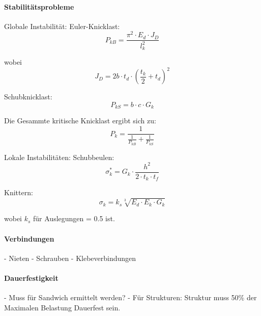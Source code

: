   \paragraph{Stabilitätsprobleme}
  Globale Instabilität:
    Euler-Knicklast:
    \begin{equation}
      \label{Euler-Knicklast}
      P_{kB}=\frac{\pi^2 \cdot E_d \cdot J_D}{l_k^2}
    \end{equation}

    wobei
    \begin{equation}
      \label{JD}
      J_D = 2b \cdot t_d\cdot \left ( \frac{t_k}{2}+t_d \right )^2
    \end{equation}

    Schubknicklast:
    \begin{equation}
      \label{Schubknicklast}
      P_{kS} = b \cdot c \cdot G_k
    \end{equation}

    Die Gesammte kritische Knicklast ergibt sich zu:
    \begin{equation}
      \label{Knicklast}
      P_k=\frac{1}{\frac{1}{P_{kB}}+\frac{1}{P_{kS}}}
    \end{equation}

  Lokale Instabilitäten:
  Schubbeulen:
  \begin{equation}
    \label{Schubbeulen}
    \sigma_k^* = G_k \cdot \frac{h^2}{2 \cdot t_k \cdot t_f}
  \end{equation}

  Knittern:
  \begin{equation}
    \label{Knittern}
    \sigma_k = k_s\sqrt[3]{E_d \cdot E_k \cdot G_k}
  \end{equation}

  wobei \(k_s\) für Auslegungen = 0.5 ist.


\paragraph{Verbindungen}
  - Nieten
  - Schrauben
  - Klebeverbindungen

\paragraph{Dauerfestigkeit}
  - Muss für Sandwich ermittelt werden?
  - Für Strukturen: Struktur muss 50\% der Maximalen Belastung Dauerfest sein.
